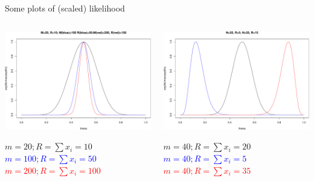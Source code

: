 \documentclass[ignorenonframetext,]{beamer}
\begin{document}
\begin{frame}{Some plots of (scaled) likelihood}
\protect\hypertarget{some-plots-of-scaled-likelihood}{}

\begin{columns}
\begin{column}{0.5\textwidth}

\begin{center}\includegraphics[width=1\linewidth]{lecture4_files/figure-beamer/unnamed-chunk-5-1} \end{center}


 $m=20; R=\sum x_i=10$
 \textcolor{blue}{$m=100; R=\sum{x_i}=50$}
 \textcolor{red}{$m=200; R=\sum{x_i}=100$}
  
  
\end{column}
\begin{column}{0.5\textwidth}

\begin{center}\includegraphics[width=1\linewidth]{lecture4_files/figure-beamer/unnamed-chunk-6-1} \end{center}
 $m=40; R=\sum x_i=20$
 \textcolor{blue}{$m=40; R=\sum{x_i}=5$}
 \textcolor{red}{$m=40; R=\sum{x_i}=35$}
\end{column}

\end{columns}

\end{frame}
\end{document}
